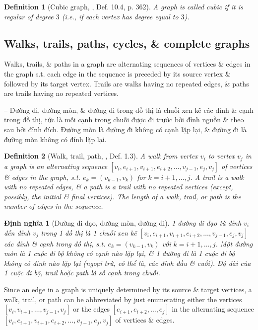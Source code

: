 \documentclass[oneside]{book}
\newtheorem{definition}{Definition}
\newtheorem{dinhnghia}{Định nghĩa}
\begin{document}
\begin{definition}[Cubic graph, \cite{Shahriari2022}, Def. 10.4, p. 362]
	A graph is called {\rm cubic} if it is regular of degree $3$ (i.e., if each vertex has degree equal to $3$).
\end{definition}

\subsection{Walks, trails, paths, cycles, \& complete graphs}
Walks, trails, \& paths in a graph are alternating sequences of vertices \& edges in the graph s.t. each edge in the sequence is preceded by its source vertex \& followed by its target vertex. Trails are walks having no repeated edges, \& paths are trails having no repeated vertices.

-- Đường đi, đường mòn, \& đường đi trong đồ thị là chuỗi xen kẽ các đỉnh \& cạnh trong đồ thị, tức là mỗi cạnh trong chuỗi được đi trước bởi đỉnh nguồn \& theo sau bởi đỉnh đích. Đường mòn là đường đi không có cạnh lặp lại, \& đường đi là đường mòn không có đỉnh lặp lại.

\begin{definition}[Walk, trail, path, \cite{Valiente2021}, Def. 1.3]
	A {\rm walk} from vertex $v_i$ to vertex $v_j$ in a graph is an alternating sequence $[v_i,e_{i+1},v_{i+1},e_{i+2},\ldots,v_{j-1},e_j,v_j]$ of vertices \& edges in the graph, s.t. $e_k = (v_{k-1},v_k)$ for $k = i + 1,\ldots,j$. A {\rm trail} is a walk with no repeated edges, \& a {\rm path} is a trail with no repeated vertices (except, possibly, the initial \& final vertices). The length of a walk, trail, or path is the number of edges in the sequence.
\end{definition}

\begin{dinhnghia}[Đường đi dạo, đường mòn, đường đi]
	1 {\rm đường đi dạo} từ đỉnh $v_i$ đến đỉnh $v_j$ trong 1 đồ thị là 1 chuỗi xen kẽ $[v_i,e_{i+1},v_{i+1},e_{i+2},\ldots,v_{j-1},e_j,v_j]$ các đỉnh \& cạnh trong đồ thị, s.t. $e_k = (v_{k-1},v_k)$ với $k = i + 1,\ldots,j$. Một {\rm đường mòn} là 1 cuộc đi bộ không có cạnh nào lặp lại, \& 1 {\rm đường đi} là 1 cuộc đi bộ không có đỉnh nào lặp lại (ngoại trừ, có thể là, các đỉnh đầu \& cuối). Độ dài của 1 cuộc đi bộ, trail hoặc path là số cạnh trong chuỗi.	
\end{dinhnghia}
Since an edge in a graph is uniquely determined by its source \& target vertices, a walk, trail, or path can be abbreviated by just enumerating either the vertices $[v_i,v_{i+1},\ldots,v_{j-1},v_j]$ or the edges $[e_{i+1},e_{i+2},\ldots,e_j]$ in the alternating sequence $[v_i,e_{i+1},v_{i+1},e_{i+2},\ldots,v_{j-1},e_j,v_j]$ of vertices \& edges.
\end{document}
